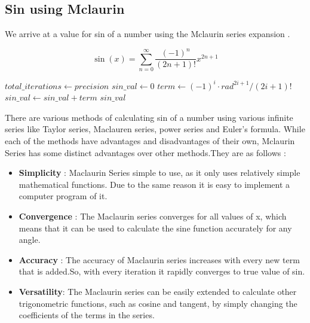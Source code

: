 \documentclass{report}
\begin{document}
\subsection{Sin using Mclaurin}
\begin{flushleft}
We arrive at a value for sin of a number using the Mclaurin series expansion \cite{doi:10.1137/1021091}.
\end{flushleft}
$$\sin(x) = \sum_{n=0}^{\infty} \frac{(-1)^n}{(2n+1)!}x^{2n+1}$$
\begin{algorithmic}[1]
        \State $total\_iterations \gets precision$
        \State $sin\_val \gets 0$
            \State $term \gets (-1)^i \cdot rad^{2i + 1} / (2i + 1)!$
            \State $sin\_val \gets sin\_val + term$
        \EndFor
        \State \Return $sin\_val$
    \EndFunction
\end{algorithmic}
\begin{flushleft}
There are various methods of calculating sin of a number using various infinite series like Taylor series, Maclauren series, power series and Euler's formula.
While each of the methods have advantages and disadvantages of their own, Mclaurin Series has some distinct advantages over other methods.They are as follows :
\end{flushleft}
\begin{itemize}
  \item \textbf{Simplicity} : Maclaurin Series simple to use, as it only uses relatively simple mathematical functions. Due to the same reason it is easy to implement a computer program of it.
  \item \textbf{Convergence} : The Maclaurin series converges for all values of x, which means that it can be used to calculate the sine function accurately for any angle.
  \item  \textbf{Accuracy} : The accuracy of Maclaurin series increases with every new term that is added.So, with every iteration it rapidly converges to true value of sin.
  \item \textbf{Versatility}: The Maclaurin series can be easily extended to calculate other trigonometric functions, such as cosine and tangent, by simply changing the coefficients of the terms in the series.
\end{itemize}
\end{document}
